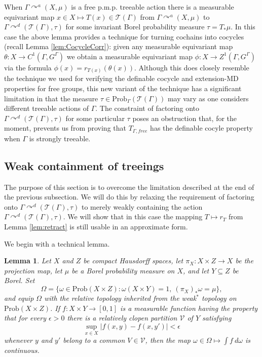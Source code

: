 \documentclass[12pt]{amsart}
\newtheorem{lem}[thm]{Lemma}
\theoremstyle{definition}
\def\cal{\mathcal}
\newcommand{\pmp}{p{$.$}m{$.$}p{$.$}}
\newcommand{\acts}{\curvearrowright}
\newcommand{\Prob}{\mathrm{Prob}}
\begin{document}
When $\Gamma \acts^a (X, \mu)$ is a free {\pmp} treeable action there is a measurable equivariant map $x \in X \mapsto T(x) \in \cal T(\Gamma)$ from $\Gamma \acts^a (X, \mu)$ to $\Gamma \acts^d (\cal T(\Gamma), \tau)$ for some invariant Borel probability measure $\tau = T_* \mu$. In this case the above lemma provides a technique for turning cochains into cocycles (recall Lemma \ref{lem:CocycleCorr}): given any measurable equivariant map $\theta : X \rightarrow C^1(\Gamma, G^\Gamma)$ we obtain a measurable equivariant map $\phi : X \rightarrow Z^1(\Gamma, G^\Gamma)$ via the formula $\phi(x) = r_{T(x)}(\theta(x))$. Although this does closely resemble the technique we used for verifying the definable cocycle and extension-MD properties for free groups, this new variant of the technique has a significant limitation in that the measure $\tau \in \Prob_\Gamma(\cal T(\Gamma))$ may vary as one considers different treeable actions of $\Gamma$. The constraint of factoring onto $\Gamma \acts^d (\cal T(\Gamma), \tau)$ for some particular $\tau$ poses an obstruction that, for the moment, prevents us from proving that $T_{\Gamma,free}$ has the definable cocyle property when $\Gamma$ is strongly treeable.


\subsection{Weak containment of treeings}\label{subs:treeable}

The purpose of this section is to overcome the limitation described at the end of the previous subsection. We will do this by relaxing the requirement of factoring onto $\Gamma \acts^d (\cal T(\Gamma), \tau)$ to merely weakly containing the action $\Gamma \acts^d (\cal T(\Gamma), \tau)$. We will show that in this case the mapping $T \mapsto r_T$ from Lemma \ref{lem:retract} is still usable in an approximate form.

We begin with a technical lemma.

\begin{lem} \label{lem:reltop}
	Let $X$ and $Z$ be compact Hausdorff spaces, let $\pi_X : X \times Z \rightarrow X$ be the projection map, let $\mu$ be a Borel probability measure on $X$, and let $Y \subseteq Z$ be Borel. Set
	\[\Omega = \{\omega \in \Prob(X \times Z) : \omega(X \times Y) = 1, \ (\pi_X)_* \omega = \mu\},\]
	and equip $\Omega$ with the relative topology inherited from the weak$^*$ topology on $\Prob(X \times Z)$. If $f : X \times Y \rightarrow [0,1]$ is a measurable function having the property that for every $\epsilon > 0$ there is a relatively clopen partition $\cal V$ of $Y$ satisfying
	\[\sup_{x \in X} |f(x,y) - f(x,y')| < \epsilon\]
	whenever $y$ and $y'$ belong to a common $V \in \cal V$, then the map $\omega \in \Omega \mapsto \int f \ d \omega$ is continuous.
\end{lem}
\end{document}
